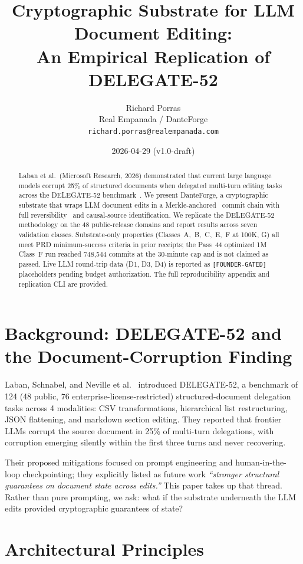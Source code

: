\documentclass[11pt]{article}
\title{Cryptographic Substrate for LLM Document Editing:\\An Empirical Replication of DELEGATE-52}
\author{Richard Porras\\\small Real Empanada / DanteForge\\\small \texttt{richard.porras@realempanada.com}}
\date{2026-04-29 \quad (v1.0-draft)}
\begin{document}
\maketitle

\begin{abstract}
Laban et al.~(Microsoft Research, 2026) demonstrated that current large language models corrupt 25\% of structured documents when delegated multi-turn editing tasks across the DELEGATE-52 benchmark~\cite{laban2026delegate52}. We present DanteForge, a cryptographic substrate that wraps LLM document edits in a Merkle-anchored~\cite{nakamoto2008bitcoin} commit chain with full reversibility~\cite{loeliger2012git} and causal-source identification. We replicate the DELEGATE-52 methodology on the 48 public-release domains and report results across seven validation classes. Substrate-only properties (Classes~A,~B,~C,~E,~F at 100K, G) all meet PRD minimum-success criteria in prior receipts; the Pass~44 optimized 1M Class~F run reached 748{,}544 commits at the 30-minute cap and is not claimed as passed. Live LLM round-trip data (D1, D3, D4) is reported as \texttt{[FOUNDER-GATED]} placeholders pending budget authorization. The full reproducibility appendix and replication CLI are provided.
\end{abstract}

\section{Background: DELEGATE-52 and the Document-Corruption Finding}

Laban, Schnabel, and Neville et al.~\cite{laban2026delegate52} introduced DELEGATE-52, a benchmark of 124 (48 public, 76 enterprise-license-restricted) structured-document delegation tasks across 4 modalities: CSV transformations, hierarchical list restructuring, JSON flattening, and markdown section editing. They reported that frontier LLMs corrupt the source document in 25\% of multi-turn delegations, with corruption emerging silently within the first three turns and never recovering.

Their proposed mitigations focused on prompt engineering and human-in-the-loop checkpointing; they explicitly listed as future work \emph{``stronger structural guarantees on document state across edits.''} This paper takes up that thread. Rather than pure prompting, we ask: what if the substrate underneath the LLM edits provided cryptographic guarantees of state?

\section{Architectural Principles}
\end{document}
